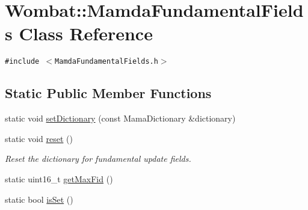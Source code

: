 \hypertarget{classWombat_1_1MamdaFundamentalFields}{
\section{Wombat::Mamda\-Fundamental\-Fields Class Reference}
\label{classWombat_1_1MamdaFundamentalFields}
}
{\tt \#include $<$Mamda\-Fundamental\-Fields.h$>$}

\subsection*{Static Public Member Functions}
\begin{CompactItemize}
\item 
static void \hyperlink{classWombat_1_1MamdaFundamentalFields_3d638ca8f449c896788024326b50efb9}{set\-Dictionary} (const Mama\-Dictionary \&dictionary)
\item 
static void \hyperlink{classWombat_1_1MamdaFundamentalFields_5584ab834e87c24cfae48ed21870a067}{reset} ()
\begin{CompactList}\small\item\em Reset the dictionary for fundamental update fields. \item\end{CompactList}\item 
static uint16\_\-t \hyperlink{classWombat_1_1MamdaFundamentalFields_e70f8c7677b393d516ce92bc40ae9f1d}{get\-Max\-Fid} ()
\item 
static bool \hyperlink{classWombat_1_1MamdaFundamentalFields_e76100283fe238a51a604d7a453d5681}{is\-Set} ()
\end{CompactItemize}
